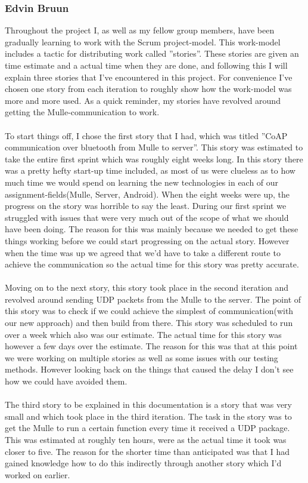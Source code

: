 \subsubsection{Edvin Bruun}
Throughout the project I, as well as my fellow group members, have been gradually learning to work with the Scrum project-model.
This work-model includes a tactic for distributing work called ''stories''. These stories are given an time estimate and a actual time when they are done, 
and following this I will explain three stories that I've encountered in this project. 
For convenience I've chosen one story from each iteration to roughly show how the work-model was more and more used. As a quick reminder, my stories have revolved around getting the Mulle-communication to work.
\\\\
To start things off, I chose the first story that I had, which was titled ''CoAP communication over bluetooth from Mulle to server''.
This story was estimated to take the entire first sprint which was roughly eight weeks long. In this story there was a pretty hefty start-up time included, 
as most of us were clueless as to how much time we would spend on learning the new technologies in each of our assignment-fields(Mulle, Server, Android).
When the eight weeks were up, the progress on the story was horrible to say the least. During our first sprint we struggled with issues that were very much 
out of the scope of what we should have been doing. The reason for this was mainly because we needed to get these things working before we could start progressing on the actual story.
However when the time was up we agreed that we'd have to take a different route to achieve the communication so the actual time for this story was pretty accurate.
\\\\
Moving on to the next story, this story took place in the second iteration and revolved around sending UDP packets from the Mulle to the server.
The point of this story was to check if we could achieve the simplest of communication(with our new approach) and then build from there. This story was scheduled to run over 
a week  which also was our estimate. The actual time for this story was however a few days over the estimate. The reason for this was that at this point we were working on multiple stories as
well as some issues with our testing methods. However looking back on the things that caused the delay I don't see how we could have avoided them.
\\\\
The third story to be explained in this documentation is a story that was very small and which took place in the third iteration.
The task in the story was to get the Mulle to run a certain function every time it received a UDP package. This was estimated at roughly ten hours, 
were as the actual time it took was closer to five. The reason for the shorter time than anticipated was that I had gained knowledge how to do this 
indirectly through another story which I'd worked on earlier.
